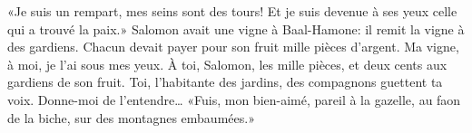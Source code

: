 «Je suis un rempart, mes seins sont des tours!
	Et je suis devenue à ses yeux celle qui a trouvé la paix.»
Salomon avait une vigne à Baal-Hamone:
	il remit la vigne à des gardiens.
	Chacun devait payer pour son fruit mille pièces d’argent.
Ma vigne, à moi, je l’ai sous mes yeux.
	À toi, Salomon, les mille pièces, et deux cents aux gardiens de son fruit.
Toi, l’habitante des jardins, des compagnons guettent ta voix.
	Donne-moi de l’entendre…
«Fuis, mon bien-aimé, pareil à la gazelle, au faon de la biche,
	sur des montagnes embaumées.»
